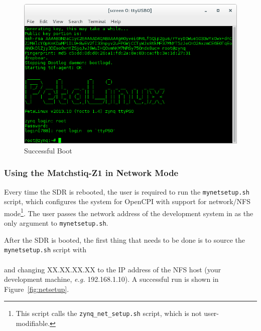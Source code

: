 \begin{figure}[ht]
	\centerline{\includegraphics[scale=0.5]{Matchstiq_Z1_login}}
	\caption{Successful Boot}
	\label{fig:boot1}
\end{figure}
\subsubsection*{Using the Matchstiq-Z1 in Network Mode}
\begin{flushleft}
Every time the SDR is rebooted, the user is required to run the \texttt{mynetsetup.sh} script, which configures the system for OpenCPI with support for network/NFS mode\footnote{This script calls the \texttt{zynq\_net\_setup.sh} script, which is not user-modifiable.}. The user passes the network address of the development system in as the only argument to \texttt{mynetsetup.sh}.
\end{flushleft}
\begin{flushleft}
After the SDR is booted, the first thing that needs to be done is to source the \texttt{mynetsetup.sh} script with\\
\leavevmode{\parindent=3em\indent}\\
and changing XX.XX.XX.XX to the IP address of the NFS host (your development machine, \textit{e.g.} 192.168.1.10). A successful run is shown in Figure~\ref{fig:netsetup}.
\end{flushleft}

